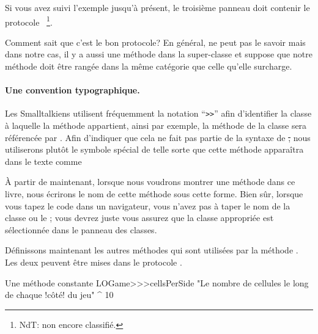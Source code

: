 \documentclass[a4paper,10pt,twoside]{book}
\begin{document}
Si vous avez suivi l'exemple jusqu'à présent, le troisième panneau doit contenir le protocole ~\footnote{NdT: non encore classifié.}.

Comment \pharo sait que c'est le bon protocole? En général,
\pharo ne peut pas le savoir mais dans notre cas, il y a aussi une méthode  dans la super-classe et \pharo suppose que notre méthode  doit \^etre rangée dans la m\^eme catégorie que celle qu'elle surcharge.


\paragraph{Une convention typographique.} Les Smalltalkiens utilisent fréquemment la notation ``\verb|>>|'' afin d'identifier la classe à laquelle la méthode appartient, ainsi par exemple, la méthode  de la classe  sera référencée par .
Afin d'indiquer que cela ne fait pas partie de la syntaxe de \st, nous utiliserons plutôt le symbole spécial \ct{>>>} de telle sorte que cette méthode apparaîtra dans le texte comme 

À partir de maintenant, lorsque nous voudrons montrer une méthode dans ce livre, nous écrirons le nom de cette méthode sous cette forme. Bien s\^ur, lorsque vous tapez le code dans un navigateur, vous n'avez pas à taper le nom de la classe ou le \ct{>>>}; vous devrez juste vous assurez que la classe appropriée est sélectionnée dans le panneau des classes.

Définissons maintenant les autres méthodes qui sont utilisées par la méthode . Les deux peuvent \^etre mises dans le protocole .

\begin{method}[sbegamecellsperside]{Une méthode constante}
LOGame>>>cellsPerSide
   "Le nombre de cellules le long de chaque !c\^oté! du jeu"
   ^ 10
\end{method}
\end{document}
